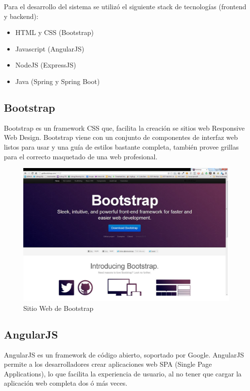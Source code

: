 		Para el desarrollo del sistema se utilizó el siguiente stack de tecnologías
		(frontend y backend):
		
		\begin{itemize}
		  \item HTML y CSS (Bootstrap)
		  \item Javascript (AngularJS)
		  \item NodeJS (ExpressJS)
		  \item Java (Spring y Spring Boot)
		\end{itemize}
		
		\subsection{Bootstrap}
			Bootstrap es un framework CSS que, facilita la creación se sitios web
			Responsive Web Design. Bootstrap viene con un conjunto de componentes de
			interfaz web listos para usar y una guía de estilos bastante completa,
			también provee grillas para el correcto maquetado de una web profesional.
			
			\begin{figure}[H]
			    \centering
				\includegraphics[width=17cm]{../imgs/ejemplos/bootstrap.png}
				\caption{Sitio Web de Bootstrap}
			\end{figure}
			
		
		\subsection{AngularJS}
			AngularJS es un framework de código abierto, soportado por Google. AngularJS
			permite a los desarrolladores crear aplicaciones web SPA (Single Page Applications), lo
			que facilita la experiencia de usuario, al no tener que cargar la
			aplicación web completa dos ó más veces.\\\
			

